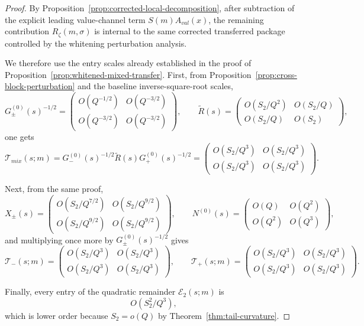 \documentclass[11pt,a4paper]{amsart}
\def\val{val}%
\def\mix{mix}%
\theoremstyle{plain}
\theoremstyle{definition}
\newcommand{\val}{\mathrm{val}}
\newcommand{\mix}{\mathrm{mix}}
\begin{document}
\begin{proof}
By Proposition~\ref{prop:corrected-local-decomposition}, after subtraction of
the explicit leading value-channel term $S(m)A_{\val}(x)$, the remaining
contribution $R_\zeta(m,\sigma)$ is internal to the same corrected
transferred package controlled by the whitening perturbation analysis.

We therefore use the entry scales already established in the proof of
Proposition~\ref{prop:whitened-mixed-transfer}. First, from
Proposition~\ref{prop:cross-block-perturbation} and the baseline
inverse-square-root scales,
\[
G_\pm^{(0)}(s)^{-1/2}
=
\begin{pmatrix}
O(Q^{-1/2}) & O(Q^{-3/2})\\
O(Q^{-3/2}) & O(Q^{-3/2})
\end{pmatrix},
\qquad
\widetilde R(s)=
\begin{pmatrix}
O(S_2/Q^2) & O(S_2/Q)\\
O(S_2/Q) & O(S_2)
\end{pmatrix},
\]
one gets
\[
\mathcal T_{\mix}(s;m)
=
G_-^{(0)}(s)^{-1/2}\widetilde R(s)G_+^{(0)}(s)^{-1/2}
=
\begin{pmatrix}
O(S_2/Q^3) & O(S_2/Q^3)\\
O(S_2/Q^3) & O(S_2/Q^3)
\end{pmatrix}.
\]

Next, from the same proof,
\[
X_\pm(s)=
\begin{pmatrix}
O(S_2/Q^{7/2}) & O(S_2/Q^{9/2})\\
O(S_2/Q^{9/2}) & O(S_2/Q^{9/2})
\end{pmatrix},
\qquad
N^{(0)}(s)=
\begin{pmatrix}
O(Q) & O(Q^2)\\
O(Q^2) & O(Q^3)
\end{pmatrix},
\]
and multiplying once more by $G_\pm^{(0)}(s)^{-1/2}$ gives
\[
\mathcal T_-(s;m)=
\begin{pmatrix}
O(S_2/Q^3) & O(S_2/Q^3)\\
O(S_2/Q^3) & O(S_2/Q^3)
\end{pmatrix},
\qquad
\mathcal T_+(s;m)=
\begin{pmatrix}
O(S_2/Q^3) & O(S_2/Q^3)\\
O(S_2/Q^3) & O(S_2/Q^3)
\end{pmatrix}.
\]

Finally, every entry of the quadratic remainder $\mathcal E_2(s;m)$ is
\[
O(S_2^2/Q^3),
\]
which is lower order because $S_2=o(Q)$ by
Theorem~\ref{thm:tail-curvature}.


\end{proof}
\end{document}
